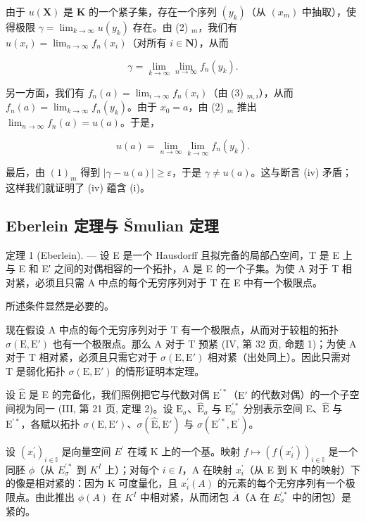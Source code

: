 由于 \(u(\mathbf{X})\) 是 \(\mathbf{K}\) 的一个紧子集，存在一个序列 \((y_k)\)（从 \((x_m)\) 中抽取），使得极限 \(\gamma = \lim_{k\to \infty}u(y_k)\) 存在。由 (2) \(_m\)，我们有 \(u(x_i) = \lim_{n\to \infty}f_n(x_i)\)（对所有 \(i\in \mathbf{N}\)），从而

\[
\gamma = \lim _ {k \rightarrow \infty} \lim _ {n \rightarrow \infty} f _ {n} (y _ {k}).\tag{4}
\]

另一方面，我们有 \(f_{n}(a) = \lim_{i\to \infty}f_{n}(x_{i})\)（由 (3) \(_{m,i}\)），从而 \(f_{n}(a) = \lim_{k\to \infty}f_{n}(y_{k})\)。由于 \(x_0 = a\)，由 (2) \(_{m}\) 推出 \(\lim_{n\to \infty}f_n(a) = u(a)\)。于是，

\[
u (a) = \lim _ {n \rightarrow \infty} \lim _ {k \rightarrow \infty} f _ {n} (y _ {k}).\tag{5}
\]

最后，由 \((1)_{m}\) 得到 \(|\gamma - u(a)| \geqslant \varepsilon\)，于是 \(\gamma \neq u(a)\)。这与断言 (iv) 矛盾；这样我们就证明了 (iv) 蕴含 (i)。

\subsection{Eberlein 定理与 Šmulian 定理}

定理 1 (Eberlein). --- 设 E 是一个 Hausdorff 且拟完备的局部凸空间，T 是 E 上与 E 和 E′ 之间的对偶相容的一个拓扑，A 是 E 的一个子集。为使 A 对于 T 相对紧，必须且只需 A 中点的每个无穷序列对于 T 在 E 中有一个极限点。

所述条件显然是必要的。

现在假设 A 中点的每个无穷序列对于 T 有一个极限点，从而对于较粗的拓扑 \(\sigma(\mathrm{E}, \mathrm{E}')\) 也有一个极限点。那么 A 对于 T 预紧 (IV, 第 32 页, 命题 1)；为使 A 对于 T 相对紧，必须且只需它对于 \(\sigma(\mathrm{E}, \mathrm{E}')\) 相对紧（出处同上）。因此只需对 T 是弱化拓扑 \(\sigma(\mathrm{E}, \mathrm{E}')\) 的情形证明本定理。

设 \(\hat{\mathrm{E}}\) 是 E 的完备化，我们照例把它与代数对偶 \(\mathrm{E}^{\prime *}\)（\(\mathrm{E}'\) 的代数对偶）的一个子空间视为同一 (III, 第 21 页, 定理 2)。设 \(\mathrm{E}_{\sigma}\)、\(\hat{\mathrm{E}}_{\sigma}\) 与 \(\mathrm{E}_{\sigma}^{\prime *}\) 分别表示空间 E、\(\hat{\mathrm{E}}\) 与 \(\mathrm{E}^{\prime *}\)，各赋以拓扑 \(\sigma (\mathrm{E},\mathrm{E}')\)、\(\sigma (\hat{\mathrm{E}},\mathrm{E}')\) 与 \(\sigma (\mathrm{E}^{\prime *},\mathrm{E}^{\prime})\)。

设 \((x_{i}^{\prime})_{i\in\mathbb{I}}\) 是向量空间 \(E^{\prime}\) 在域 K 上的一个基。映射 \(f\mapsto(f(x_{i}^{\prime}))_{i\in\mathbb{I}}\) 是一个同胚 \(\phi\)（从 \(E_{\sigma}^{\prime*}\) 到 \(K^{I}\) 上）；对每个 \(i\in I\)，A 在映射 \(x_{i}^{\prime}\)（从 E 到 K 中的映射）下的像是相对紧的：因为 K 可度量化，且 \(x_{i}^{\prime}(A)\) 的元素的每个无穷序列有一个极限点。由此推出 \(\phi(A)\) 在 \(K^{I}\) 中相对紧，从而闭包 \(\overline{A}\)（A 在 \(E_{\sigma}^{\prime*}\) 中的闭包）是紧的。

